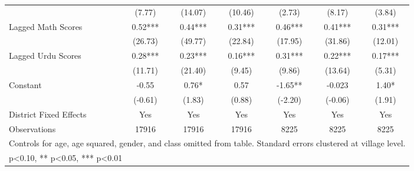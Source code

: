 \begin{sidewaystable}[htbp]
\begin{tabular}{l*{6}{c}}
                &   (7.77)   &  (14.07)   &  (10.46)   &   (2.73)   &   (8.17)   &   (3.84)   \\
Lagged Math Scores&     0.52***&     0.44***&     0.31***&     0.46***&     0.41***&     0.31***\\
                &  (26.73)   &  (49.77)   &  (22.84)   &  (17.95)   &  (31.86)   &  (12.01)   \\
Lagged Urdu Scores&     0.28***&     0.23***&     0.16***&     0.31***&     0.22***&     0.17***\\
                &  (11.71)   &  (21.40)   &   (9.45)   &   (9.86)   &  (13.64)   &   (5.31)   \\
Constant        &    -0.55   &     0.76*  &     0.57   &    -1.65** &   -0.023   &     1.40*  \\
                &  (-0.61)   &   (1.83)   &   (0.88)   &  (-2.20)   &  (-0.06)   &   (1.91)   \\
District Fixed Effects&      Yes   &      Yes   &      Yes   &      Yes   &      Yes   &      Yes   \\
\midrule
Observations    &    17916   &    17916   &    17916   &     8225   &     8225   &     8225   \\
\bottomrule
\multicolumn{7}{l}{\footnotesize Controls for age, age squared, gender, and class omitted from table. Standard errors clustered at village level.}\\
\multicolumn{7}{l}{\footnotesize * p<0.10, ** p<0.05, *** p<0.01}\\
\end{tabular}
\end{sidewaystable}
